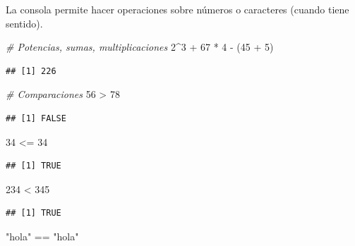 \documentclass[]{article}
\newenvironment{Shaded}{\begin{snugshade}}{\end{snugshade}}
\newcommand{\DecValTok}[1]{\textcolor[rgb]{0.00,0.00,0.81}{{#1}}}
\newcommand{\StringTok}[1]{\textcolor[rgb]{0.31,0.60,0.02}{{#1}}}
\newcommand{\CommentTok}[1]{\textcolor[rgb]{0.56,0.35,0.01}{\textit{{#1}}}}
\newcommand{\NormalTok}[1]{{#1}}
\begin{document}
La consola permite hacer operaciones sobre números o caracteres (cuando
tiene sentido).

\begin{Shaded}
\begin{Highlighting}[]
\CommentTok{# Potencias, sumas, multiplicaciones}
\DecValTok{2}\NormalTok{^}\DecValTok{3} \NormalTok{+}\StringTok{ }\DecValTok{67} \NormalTok{*}\StringTok{ }\DecValTok{4} \NormalTok{-}\StringTok{ }\NormalTok{(}\DecValTok{45} \NormalTok{+}\StringTok{ }\DecValTok{5}\NormalTok{)}
\end{Highlighting}
\end{Shaded}

\begin{verbatim}
## [1] 226
\end{verbatim}

\begin{Shaded}
\begin{Highlighting}[]
\CommentTok{# Comparaciones}
\DecValTok{56} \NormalTok{>}\StringTok{ }\DecValTok{78} 
\end{Highlighting}
\end{Shaded}

\begin{verbatim}
## [1] FALSE
\end{verbatim}

\begin{Shaded}
\begin{Highlighting}[]
\DecValTok{34} \NormalTok{<=}\StringTok{ }\DecValTok{34}
\end{Highlighting}
\end{Shaded}

\begin{verbatim}
## [1] TRUE
\end{verbatim}

\begin{Shaded}
\begin{Highlighting}[]
\DecValTok{234} \NormalTok{<}\StringTok{ }\DecValTok{345}
\end{Highlighting}
\end{Shaded}

\begin{verbatim}
## [1] TRUE
\end{verbatim}

\begin{Shaded}
\begin{Highlighting}[]
\StringTok{"hola"} \NormalTok{==}\StringTok{ "hola"}
\end{Highlighting}
\end{Shaded}
\end{document}
